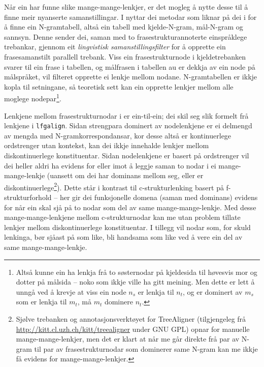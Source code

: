 \documentclass[12pt,a4paper,oneside,draft]{report}
\begin{document}
 Når ein har funne slike mange\hyp{}mange\hyp{}lenkjer, er det mogleg
 å nytte desse til å finne meir nyanserte samanstillingar.  I
 \citet{samuelsson2007apa} nyttar dei metodar som liknar på dei i
 \citet{koehn2003spb} for å finne ein N-gramtabell, altså ein tabell
 med kjelde-N-gram, mål-N-gram og sannsyn. Denne sender dei, saman med
 to frasestrukturannoterte einspråklege trebankar, gjennom eit
 \emph{lingvistisk samanstillingsfilter} for å opprette ein frasesamanstilt
 parallell trebank. Viss ein frasestrukturnode i kjeldetrebanken
 svarer til ein frase i tabellen, og målfrasen i tabellen au er dekkja
 av ein node på målspråket, vil filteret opprette ei lenkje mellom
 nodane.  N-gramtabellen er ikkje kopla til setningane, så teoretisk
 sett kan ein opprette lenkjer mellom alle moglege nodepar\footnote{Altså kunne ein ha lenkja frå to søsternodar på kjeldesida til
        høvesvis mor og dotter på målsida -- noko som ikkje ville ha
        gitt meining. Men dette er lett å unngå ved å krevje at viss
        ein node $n_s$ er lenkja til $n_t$, og er dominert av $m_s$
        som er lenkja til $m_t$, må $m_t$ dominere $n_t$. }.

 Lenkjene mellom frasestrukturnodar i \citet{samuelsson2007apa} er
 ein-til-ein; dei skil seg slik formelt frå lenkjene i
 \texttt{lfgalign}. Sidan strengpara dominert av nodelenkjene er ei delmengd
 av mengda med N-gramkorrespondansar, kor desse altså er kontinuerlege
 ordstrenger utan kontekst, kan dei ikkje innehalde lenkjer mellom
 diskontinuerlege konstituentar. Sidan nodelenkjene er basert på
 ordstrenger vil dei heller aldri ha evidens for eller imot å leggje
 saman to nodar i ei mange-mange-lenkje (uansett om dei har dominans
 mellom seg, eller er diskontinuerlege\footnote{Sjølve trebanken \citep{samuelsson2006pap} og
        annotasjonsverktøyet for TreeAligner (tilgjengeleg frå
        \href{http://kitt.cl.uzh.ch/kitt/treealigner}{http://kitt.cl.uzh.ch/kitt/treealigner} under GNU GPL) opnar
        for manuelle mange-mange-lenkjer, men det er klart at når me
        går direkte frå par av N-gram til par av frasestrukturnodar
        som dominerer same N-gram kan me ikkje få evidens for
        mange\hyp{}mange\hyp{}lenkjer. }). Dette står i kontrast
 til c\hyp{}strukturlenking basert på f\hyp{}strukturforhold -- her gir dei
 funksjonelle domena (saman med dominans) evidens for når ein skal sjå
 på to nodar som del av same mange-mange-lenkje.  Med desse
 mange-mange-lenkjene mellom c\hyp{}strukturnodar kan me utan problem
 tillate lenkjer mellom diskontinuerlege konstituentar. I tillegg vil
 nodar som, for skuld lenkinga, bør sjåast på som like, bli handsama
 som like ved å vere ein del av same mange-mange-lenkje.
 
\end{document}

